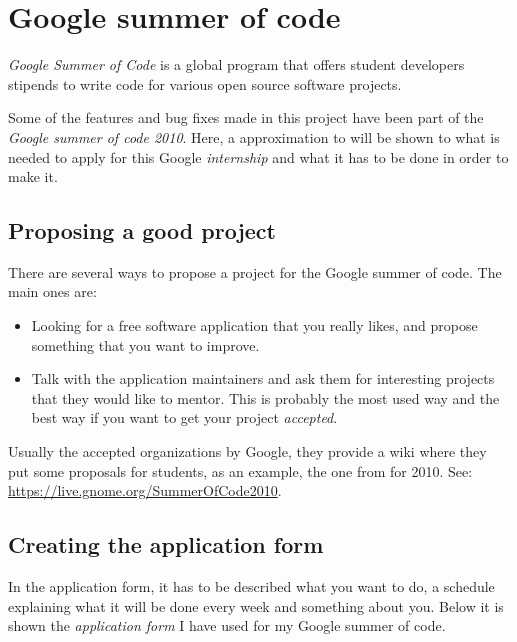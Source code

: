 
\chapter{Google summer of code}


\emph{Google Summer of Code} is a global program that offers student developers stipends to write code for various open source software projects.\cite{website:soc}

Some of the features and bug fixes made in this project have been part of the \emph{Google summer of code 2010}. Here, a approximation to will be shown to what is needed to apply for this Google \emph{internship} and what it has to be done in order to make it.


\newpage
\section{Proposing a good project}\label{sec:GoodProject}

There are several ways to propose a project for the Google summer of code. The main ones are:
\begin{itemize}
  \item Looking for a free software application that you really likes, and propose something that you want to improve.
  \item Talk with the application maintainers and ask them for interesting projects that they would like to mentor. This is probably the most used way and the best way if you want to get your project \emph{accepted}.
\end{itemize}

Usually the accepted organizations by Google, they provide a wiki where they put some proposals for students, as an example, the one from \GNOME for 2010. See: \url{https://live.gnome.org/SummerOfCode2010}.

\section{Creating the application form}\label{ApplicationForm}

In the application form, it has to be described what you want to do, a schedule explaining what it will be done every week and something about you. Below it is shown the \emph{application form} I have used for my Google summer of code.

